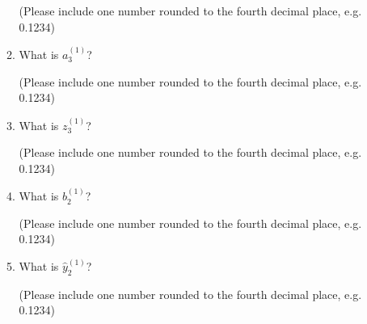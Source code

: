 \begin{enumerate}
\begin{enumerate}
        (Please include one number rounded to the fourth decimal place, e.g. 0.1234)
    
        \begin{tcolorbox}[fit,height=1cm,blank, borderline={1pt}{-2pt},nobeforeafter]
        \end{tcolorbox}
        
         \item What is $a^{(1)}_3$?
        
        (Please include one number rounded to the fourth decimal place, e.g. 0.1234)
    
        \begin{tcolorbox}[fit,height=1cm,blank, borderline={1pt}{-2pt},nobeforeafter]
        \end{tcolorbox}
        
        \item What is $z^{(1)}_3$?
        
        (Please include one number rounded to the fourth decimal place, e.g. 0.1234)
    
        \begin{tcolorbox}[fit,height=1cm,blank, borderline={1pt}{-2pt},nobeforeafter]
        \end{tcolorbox}
        
        \item What is $b^{(1)}_2$?
        
        (Please include one number rounded to the fourth decimal place, e.g. 0.1234)
        
        \begin{tcolorbox}[fit,height=1cm,blank, borderline={1pt}{-2pt},nobeforeafter]
        \end{tcolorbox}
        
        \item What is $\hat{y}^{(1)}_2$?
        
        (Please include one number rounded to the fourth decimal place, e.g. 0.1234)
        
        \begin{tcolorbox}[fit,height=1cm,blank, borderline={1pt}{-2pt},nobeforeafter]
        \end{tcolorbox}
        

\end{enumerate}
\end{enumerate}
